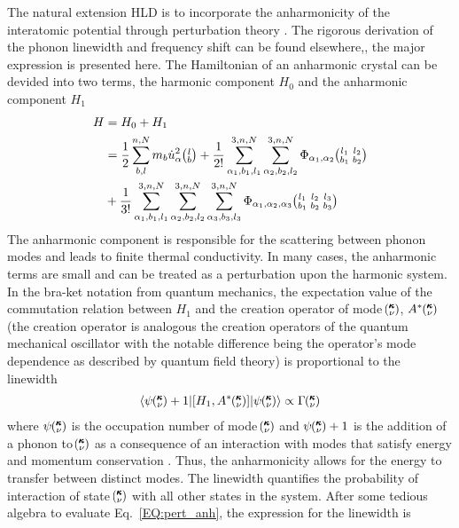 The natural extension HLD is to incorporate the anharmonicity of the interatomic potential through perturbation theory \cite{turneythesis}. The rigorous derivation of the phonon linewidth and frequency shift can be found elsewhere,\cite{PhysRev.128.2589}, the major expression is presented here. The Hamiltonian of an anharmonic crystal can be devided into two terms, the harmonic component $H_0$ and the anharmonic component $H_1$
%
\begin{equation}\label{EQ:H_anh}
\begin{split}
H&=H_0+H_1\\
&=\frac{1}{2}\sum_{b,l}^{n,N}m_b\dot{u}_\alpha^2 \lb + \frac{1}{2!}\sum_{\alpha_1,b_1,l_1}^{3,n,N}\sum_{\alpha_2,b_2,l_2}^{3,n,N}\Phi_{\alpha_1,\alpha_2} \lblb\\
&+\frac{1}{3!}\sum_{\alpha_1,b_1,l_1}^{3,n,N}\sum_{\alpha_2,b_2,l_2}^{3,n,N}\sum_{\alpha_3,b_3,l_3}^{3,n,N}\Phi_{\alpha_1,\alpha_2,\alpha_3} \lblblb\\
\end{split}
\end{equation}
%
The anharmonic component is responsible for the scattering between phonon modes and leads to finite thermal conductivity. In many cases, the anharmonic terms are small and can be treated as a perturbation upon the harmonic system. In the bra-ket notation from quantum mechanics, the expectation value of the commutation relation between $H_1$ and the creation operator of mode $\mspace{-4.0mu}\left(\mspace{-8.0mu} \begin{smallmatrix}&\pmb{\kappa} \\&\nu\end{smallmatrix} \mspace{-3.0mu}\right)$, $A^*\mspace{-4.0mu}\left(\mspace{-8.0mu} \begin{smallmatrix}&\pmb{\kappa} \\&\nu\end{smallmatrix} \mspace{-3.0mu}\right)$ (the creation operator is analogous the creation operators of the quantum mechanical oscillator with the notable difference being the operator's mode dependence as described by quantum field theory) is proportional to the linewidth
%
\begin{equation}\label{EQ:pert_anh}
\begin{split}
\langle \psi \kv+1 | [H_1,A^*\kv] | \psi \kv\rangle \propto \Gamma \kv
\end{split}
\end{equation}
%
where $\psi \mspace{-4.0mu}\left(\mspace{-8.0mu} \begin{smallmatrix}&\pmb{\kappa} \\&\nu\end{smallmatrix} \mspace{-3.0mu}\right)$ is the occupation number of mode $\mspace{-4.0mu}\left(\mspace{-8.0mu} \begin{smallmatrix}&\pmb{\kappa} \\&\nu\end{smallmatrix} \mspace{-3.0mu}\right)$ and $\psi \mspace{-4.0mu}\left(\mspace{-8.0mu} \begin{smallmatrix}&\pmb{\kappa} \\&\nu\end{smallmatrix} \mspace{-3.0mu}\right)+1$ is the addition of a phonon to $\mspace{-4.0mu}\left(\mspace{-8.0mu} \begin{smallmatrix}&\pmb{\kappa} \\&\nu\end{smallmatrix} \mspace{-3.0mu}\right)$ as a consequence of an interaction with modes that satisfy energy and momentum conservation \cite{srivastava1990physics}. Thus, the anharmonicity allows for the energy to transfer between distinct modes. The linewidth quantifies the probability of interaction of state $\mspace{-4.0mu}\left(\mspace{-8.0mu} \begin{smallmatrix}&\pmb{\kappa} \\&\nu\end{smallmatrix} \mspace{-3.0mu}\right)$ with all other states in the system. After some tedious algebra to evaluate Eq.~\ref{EQ:pert_anh}, the expression for the linewidth is
